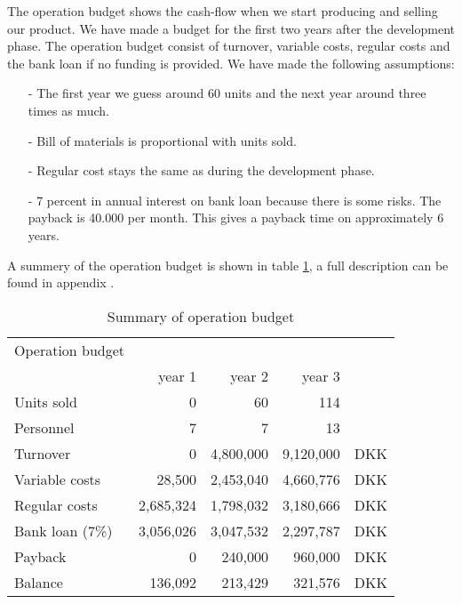 The operation budget shows the cash-flow when we start producing and selling our product. We have made a budget for the first two years after the development phase. The operation budget consist of turnover, variable costs, regular costs and the bank loan if no funding is provided. We have made the following assumptions:
\begin{itemize}
\item[-] The first year we guess around 60 units and the next year around three times as much.
\item[-] Bill of materials is proportional with units sold.
\item[-] Regular cost stays the same as during the development phase.
\item[-] 7 percent in annual interest on bank loan because there is some risks. The payback is 40.000 per month. This gives a payback time on approximately 6 years.
\end{itemize}
A summery of the operation budget is shown in table \ref{opebud}, a full description can be found in appendix .
\begin{table}[h!]
\centering
\begin{tabular}{l r r r r}
Operation budget      &            &              &             &    \\
                      & year 1     & year 2       & year 3      &    \\
\hline                                                               
Units sold            &          0 &        60   &         114  &    \\
Personnel             &          7 &         7   &          13  &    \\ 
\hline                                              
Turnover              &          0 & 4,800,000   &   9,120,000  & DKK\\
Variable costs        &     28,500 & 2,453,040   &   4,660,776  & DKK\\
Regular costs         &  2,685,324 & 1,798,032   &   3,180,666  & DKK\\
Bank loan (7\%)       &  3,056,026 & 3,047,532   &   2,297,787  & DKK\\
Payback               &          0 &   240,000   &     960,000  & DKK\\
Balance               &    136,092 &   213,429   &     321,576  & DKK\\  
\end{tabular}
\caption{Summary of operation budget}
\label{opebud}
\end{table}
